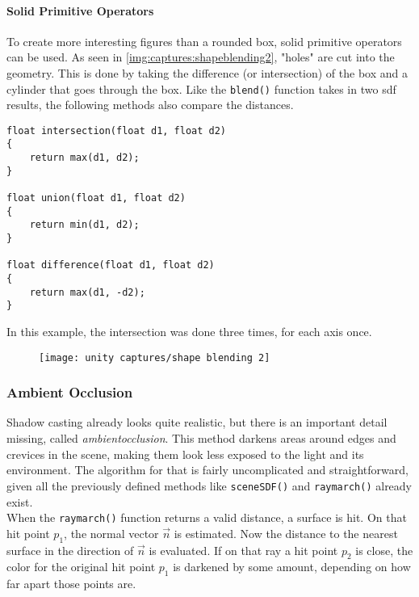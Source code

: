 \clearpage
\paragraph{Solid Primitive Operators}
To create more interesting figures than a rounded box, solid primitive operators can be used. As seen in \autoref{img:captures:shapeblending2}, "holes" are cut into the geometry. This is done by taking the difference (or intersection) of the box and a cylinder that goes through the box.
Like the \lstinline[language=HLSL]{blend()} function takes in two \gls{sdf} results, the following methods also compare the distances.

\begin{lstlisting}[language=HLSL, caption=Implementation of solid primitive operations., label=lst:shader:shapeblending:primitiveoperations]
float intersection(float d1, float d2)
{
    return max(d1, d2);
}

float union(float d1, float d2)
{
    return min(d1, d2);
}

float difference(float d1, float d2)
{
    return max(d1, -d2);
}
\end{lstlisting}

\noindent
In this example, the intersection was done three times, for each axis once.

\begin{figure}[H]
    \texttt{[image: unity captures/shape blending 2]}
    \label{img:captures:shapeblending2}
\end{figure}

\clearpage
\subsubsection{Ambient Occlusion}
Shadow casting already looks quite realistic, but there is an important detail missing, called \textit{\gls{ambientocclusion}}. This method darkens areas around edges and crevices in the scene, making them look less exposed to the light and its environment.
The algorithm for that is fairly uncomplicated and straightforward, given all the previously defined methods like \lstinline[language=HLSL]{sceneSDF()} and \lstinline[language=HLSL]{raymarch()} already exist.
\\
When the \lstinline[language=HLSL]{raymarch()} function returns a valid distance, a surface is hit. On that hit point $p_1$, the normal vector $\overrightarrow{n}$ is estimated. Now the distance to the nearest surface in the direction of $\overrightarrow{n}$ is evaluated.
If on that ray a hit point $p_2$ is close, the color for the original hit point $p_1$ is darkened by some amount, depending on how far apart those points are.

